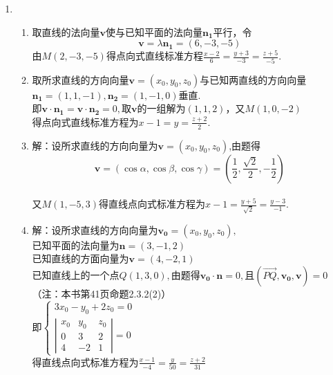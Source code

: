 \documentclass[UTF8]{ctexart}
\begin{document}
\begin{enumerate}
\item \begin{enumerate}[(1)]
\item 取直线的法向量$\mathbf{v}$使与已知平面的法向量$\mathbf{n_1}$平行，令$$\mathbf{v}=\lambda\mathbf{n_1}=\left(6,-3,-5\right)$$由$M\left(2,-3,-5\right)$得点向式直线标准方程$\displaystyle\frac{x-2}{6}=\displaystyle\frac{y+3}{-3}=\displaystyle\frac{z+5}{-5}.$
\item 取所求直线的方向向量$\mathbf{v}=\left(x_0,y_0,z_0\right)$与已知两直线的方向向量$\mathbf{n_1}=\left(1,1,-1\right),\mathbf{n_2}=\left(1,-1,0\right)$垂直.\\
即$\mathbf{v}\cdot\mathbf{n_1}=\mathbf{v}\cdot\mathbf{n_2}=0,$取$\mathbf{v}$的一组解为$\left(1,1,2\right)$，又$M\left(1,0,-2\right)$\\
得点向式直线标准方程为$x-1=y=\displaystyle\frac{z+2}{2}.$
\item 解：设所求直线的方向向量为$\mathbf{v}=\left(x_0,y_0,z_0\right)$,由题得$$\mathbf{v}=\left(\cos\alpha,\cos\beta,\cos\gamma\right)=\left(\displaystyle\frac{1}{2},\displaystyle\frac{\sqrt{2}}{2},\displaystyle-\frac{1}{2}\right)$$\\
又$M\left(1,-5,3\right)$得直线点向式标准方程为$x-1=\displaystyle\frac{y+5}{\sqrt{2}}=\displaystyle\frac{y-3}{-1}.$
\item 解：设所求直线的方向向量为$\mathbf{v_0}=\left(x_0,y_0,z_0\right),$\\
已知平面的法向量为$\mathbf{n}=\left(3,-1,2\right)$\\
已知直线的方面向量为$\mathbf{v}=\left(4,-2,1\right)$\\
已知直线上的一个点$Q\left(1,3,0\right),$由题得$\mathbf{v_0}\cdot\mathbf{n}=0,$且$\left(\overrightarrow{PQ},\mathbf{v_0},\mathbf{v}\right)=0$（注：本书第41页命题2.3.2(2)）\\
即$\left\{\begin{array}{l}3x_0-y_0+2z_0=0\\\left|\begin{array}{ccc}x_0&y_0&z_0\\0&3&2\\4&-2&1\end{array}\right|=0\end{array}\right.$\\
得直线点向式标准方程为$\displaystyle\frac{x-1}{-4}=\displaystyle\frac{y}{50}=\displaystyle\frac{z+2}{31}$
\end{enumerate}


\end{enumerate}
\end{document}
